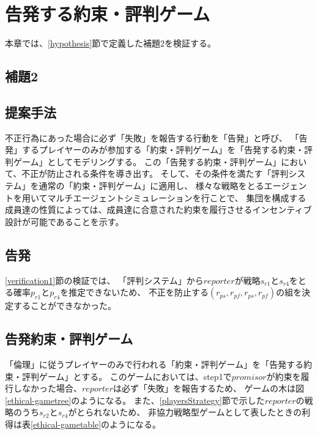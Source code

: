 \chapter{告発する約束・評判ゲーム}
本章では、\ref{hypothesis}節で定義した補題2を検証する。

\section{補題2}
\secondLemma

\section{提案手法}
不正行為にあった場合に必ず「失敗」を報告する行動を「告発」と呼び、
「告発」するプレイヤーのみが参加する「約束・評判ゲーム」を「告発する約束・評判ゲーム」としてモデリングする。
この「告発する約束・評判ゲーム」において、不正が防止される条件を導き出す。
そして、その条件を満たす「評判システム」を通常の「約束・評判ゲーム」に適用し、
様々な戦略をとるエージェントを用いてマルチエージェントシミュレーションを行ことで、
集団を構成する成員達の性質によっては、成員達に合意された約束を履行させるインセンティブ設計が可能であることを示す。

\section{告発}
\ref{verification1}節の検証では、
「評判システム」から$reporter$が戦略$s_{r1}$と$s_{r4}$をとる確率$p_{r1}$と$p_{r4}$を推定できないため、
不正を防止する$(r_{ps}, r_{pf}, r_{ps}, r_{pf})$の組を決定することができなかった。

\section{告発約束・評判ゲーム}
「倫理」に従うプレイヤーのみで行われる「約束・評判ゲーム」を「告発する約束・評判ゲーム」とする。
このゲームにおいては、step1で$promisor$が約束を履行しなかった場合、$reporter$は必ず「失敗」を報告するため、
ゲームの木は図\ref{ethical-gametree}のようになる。
また、\ref{playersStrategy}節で示した$reporter$の戦略のうち$s_{r2}$と$s_{r4}$がとられないため、
非協力戦略型ゲームとして表したときの利得は表\ref{ethical-gametable}のようになる。




